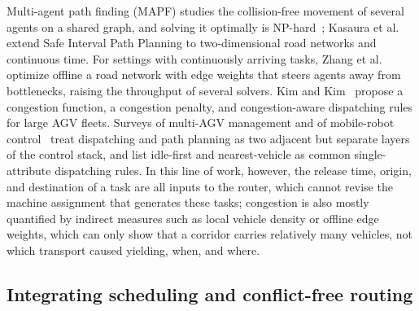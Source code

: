 \documentclass[manuscript,screen,review]{acmart}
\begin{document}
Multi-agent path finding (MAPF) studies the collision-free movement of several agents on a shared graph, and solving it optimally is NP-hard~\cite{gao2023mapf}; Kasaura et al.~\cite{kasaura2022sipp} extend Safe Interval Path Planning to two-dimensional road networks and continuous time.
For settings with continuously arriving tasks, Zhang et al.~\cite{zhang2024guidance} optimize offline a road network with edge weights that steers agents away from bottlenecks, raising the throughput of several solvers.
Kim and Kim~\cite{kim2026congestion} propose a congestion function, a congestion penalty, and congestion-aware dispatching rules for large AGV fleets.
Surveys of multi-AGV management and of mobile-robot control~\cite{lu2022agv,fragapane2021planning} treat dispatching and path planning as two adjacent but separate layers of the control stack, and list idle-first and nearest-vehicle as common single-attribute dispatching rules.
In this line of work, however, the release time, origin, and destination of a task are all inputs to the router, which cannot revise the machine assignment that generates these tasks; congestion is also mostly quantified by indirect measures such as local vehicle density or offline edge weights, which can only show that a corridor carries relatively many vehicles, not which transport caused yielding, when, and where.

\subsection{Integrating scheduling and conflict-free routing}
\end{document}
